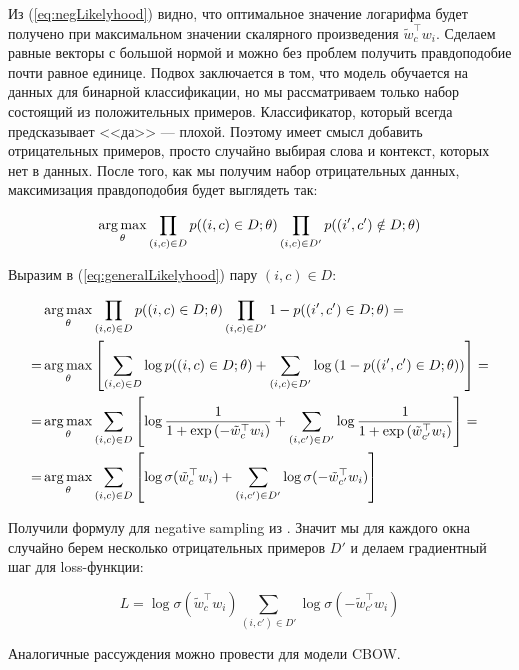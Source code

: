 Из (\ref{eq:negLikelyhood}) видно, что оптимальное значение логарифма будет получено при максимальном значении
скалярного произведения $\tilde{w}_c^{\top} w_i$. Сделаем равные векторы с большой нормой и можно без проблем
получить правдоподобие почти равное единице. Подвох заключается в том, что модель обучается на данных для
бинарной классификации, но мы рассматриваем только набор состоящий из положительных примеров. Классификатор,
который всегда предсказывает <<да>> --- плохой. Поэтому имеет смысл добавить отрицательных примеров, просто
случайно выбирая слова и контекст, которых нет в данных. После того, как мы получим набор отрицательных
данных, максимизация правдоподобия будет выглядеть так:

\begin{equation} \label{eq:generalLikelyhood}
 \operatorname*{arg\,max}_{\theta} \prod_{(i,c)\in D} p((i,c)\in D;\theta) \prod_{(i,c)\in D'} p((i',c')\notin D;\theta)
\end{equation}

Выразим в (\ref{eq:generalLikelyhood}) пару $(i,c) \in D$:

\begin{equation}
\begin{aligned}
 & \operatorname*{arg\,max}_{\theta} \prod_{(i,c)\in D} p((i,c)\in D;\theta) \prod_{(i,c)\in D'} 1-p((i',c')\in D;\theta) = \\
 = & \operatorname*{arg\,max}_{\theta} \left[\sum_{(i,c)\in D} \log{p((i,c)\in D;\theta)} + \sum_{(i,c)\in D'} \log{(
1-p((i',c')\in D;\theta))} \right] = \\
 = & \operatorname*{arg\,max}_{\theta} \sum_{(i,c)\in D} \left[\log{\frac{1}{1+\exp{(-\tilde{w}_c^{\top} w_i)}}} +
\sum_{(i,c')\in D'} \log{\frac{1}{1+\exp{(\tilde{w}_{c'}^{\top} w_i)}}} \right] = \\
 = & \operatorname*{arg\,max}_{\theta} \sum_{(i,c)\in D} \left[\log\sigma(\tilde{w}_c^{\top} w_i) + \sum_{(i,c')\in D'}
\log\sigma(-\tilde{w}_{c'}^{\top} w_i)\right]
\end{aligned}
\end{equation}

Получили формулу для negative sampling из \cite{Mikolov:2}. Значит мы для каждого окна случайно берем
несколько отрицательных примеров $D'$ и делаем градиентный шаг для loss-функции:

\begin{equation}
 L = \log\sigma(\tilde{w}_c^{\top} w_i) \sum_{(i,c')\in D'} \log\sigma(-\tilde{w}_{c'}^{\top} w_i)
\end{equation}

Аналогичные рассуждения можно провести для модели CBOW.

